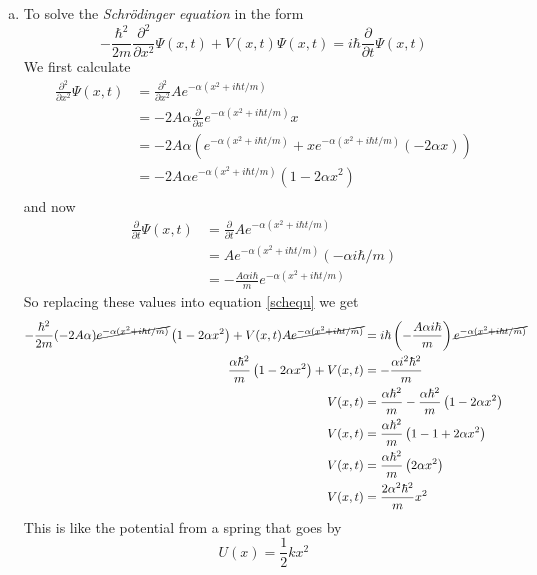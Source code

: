 \documentclass[11pt]{article}
\numberwithin{equation}{section}
\begin{document}
\begin{enumerate}[(a)]
\item
To solve the \emph{Schr\"{o}dinger equation} in the form
\begin{equation}
-\frac{\hbar^2}{2m}\frac{\partial^2}{\partial x^2}\Psi(x,t) + V(x,t)\Psi(x,t) = i\hbar\frac{\partial}{\partial t}\Psi(x,t)
\label{schequ}
\end{equation}
We first calculate
\begin{align*}
\frac{\partial^2}{\partial x^2}\Psi(x,t) &= \frac{\partial^2}{\partial x^2}Ae^{-\alpha(x^2+i\hbar t/m)}\\
&= -2A\alpha\frac{\partial}{\partial x}e^{-\alpha(x^2+i\hbar t/m)}x\\
&= -2A\alpha\left(e^{-\alpha(x^2+i\hbar t/m)}+xe^{-\alpha(x^2+i\hbar t/m)}(-2\alpha x)\right)\\
&= -2A\alpha e^{-\alpha(x^2+i\hbar t/m)}\left(1-2\alpha x^2\right)\\
\end{align*}
and now
\begin{align*}
\frac{\partial}{\partial t}\Psi(x,t) &= \frac{\partial}{\partial t} Ae^{-\alpha(x^2+i\hbar t/m)}\\
&= Ae^{-\alpha(x^2+i\hbar t/m)}(-\alpha i\hbar/m)\\
&= -\frac{A\alpha i\hbar}{m}e^{-\alpha(x^2+i\hbar t/m)}
\end{align*}
So replacing these values into equation \ref{schequ} we get
\begin{align*}
-\frac{\hbar^2}{2m}(-2A\alpha)\cancel{e^{-\alpha(x^2+i\hbar t/m)}}\left(1-2\alpha x^2\right) + V(x,t)A\cancel{e^{-\alpha(x^2+i\hbar t/m)}} &= i\hbar\left(-\frac{A\alpha i\hbar}{m}\right)\cancel{e^{-\alpha(x^2+i\hbar t/m)}}\\
\frac{\alpha\hbar^2}{m}\left(1-2\alpha x^2\right) + V(x,t) &= -\frac{\alpha i^2\hbar^2}{m}\\
V(x,t) &= \frac{\alpha\hbar^2}{m}-\frac{\alpha\hbar^2}{m}\left(1-2\alpha x^2\right)\\
V(x,t) &= \frac{\alpha\hbar^2}{m}\left(1-1+2\alpha x^2\right)\\
V(x,t) &= \frac{\alpha\hbar^2}{m}\left(2\alpha x^2\right)\\
V(x,t) &= \frac{2\alpha^2\hbar^2}{m}x^2
\end{align*}
This is like the potential from a spring that goes by
$$U(x) = \frac{1}{2}kx^2$$

\end{enumerate}
\end{document}

